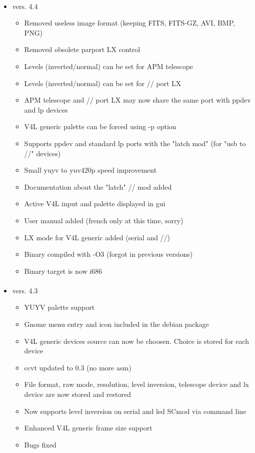 \documentclass[11pt,a4paper]{book}
\begin{document}
\paragraph*{}
\renewcommand\labelitemi{\textbullet}
\begin{itemize}
\item vers. 4.4
\begin{itemize}
\item Removed useless image format (keeping FITS, FITS-GZ, AVI, BMP, PNG)
\item Removed obsolete parport LX control
\item Levels (inverted/normal) can be set for APM telescope
\item Levels (inverted/normal) can be set for // port LX
\item APM telescope and // port LX may now share the same port with ppdev and lp devices
\item V4L generic palette can be forced using -p option
\item Supports ppdev and standard lp ports with the "latch mod" (for "usb to //" devices)
\item Small yuyv to yuv420p speed improvement
\item Documentation about the "latch" // mod added
\item Active V4L input and palette displayed in gui
\item User manual added (french only at this time, sorry)
\item LX mode for V4L generic added (serial and //)
\item Binary compiled with -O3 (forgot in previous versions)
\item Binary target is now i686
\end{itemize}
\paragraph*{}
\item vers. 4.3
\begin{itemize}
\item YUYV palette support
\item Gnome menu entry and icon included in the debian package
\item V4L generic devices source can now be choosen. Choice is stored for each device
\item ccvt updated to 0.3 (no more asm)
\item File format, raw mode, resolution, level inversion, telescope device and lx device 
 are now stored and restored
\item Now supports level inversion on serial and led SCmod via command line
\item Enhanced V4L generic frame size support
\item Bugs fixed
\end{itemize}

\end{itemize}
\end{document}
